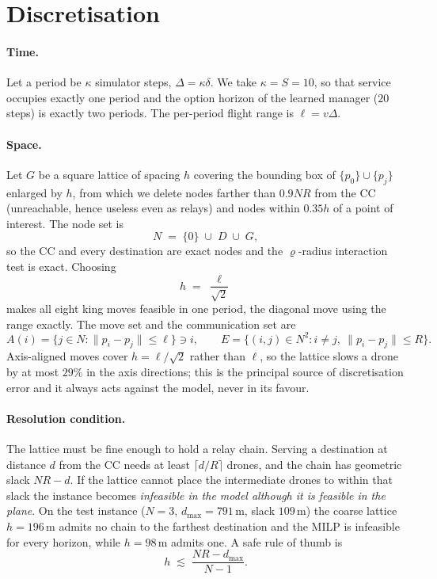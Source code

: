 \documentclass[11pt]{article}
\begin{document}
\section{Discretisation}

\paragraph{Time.} Let a period be $\kappa$ simulator steps, $\Delta = \kappa \delta$. We take
$\kappa = S = 10$, so that service occupies exactly one period and the option horizon of the
learned manager ($20$ steps) is exactly two periods. The per-period flight range is
$\ell = v\Delta$.

\paragraph{Space.} Let $G$ be a square lattice of spacing $h$ covering the bounding box of
$\{p_0\} \cup \{p_j\}$ enlarged by $h$, from which we delete nodes farther than $0.9NR$ from
the CC (unreachable, hence useless even as relays) and nodes within $0.35h$ of a point of
interest. The node set is
\[
  N \;=\; \{0\} \;\cup\; D \;\cup\; G ,
\]
so the CC and every destination are exact nodes and the $\varrho$-radius interaction test is
exact. Choosing
\[
  h \;=\; \frac{\ell}{\sqrt{2}}
\]
makes all eight king moves feasible in one period, the diagonal move using the range
exactly. The move set and the communication set are
\[
  A(i) = \{ j \in N : \|p_i - p_j\| \le \ell \} \ni i,
  \qquad
  E = \{ (i,j) \in N^2 : i \ne j,\ \|p_i - p_j\| \le R \} .
\]
Axis-aligned moves cover $h = \ell/\sqrt2$ rather than $\ell$, so the lattice slows a drone
by at most $29\%$ in the axis directions; this is the principal source of discretisation
error and it always acts against the model, never in its favour.

\paragraph{Resolution condition.} The lattice must be fine enough to hold a relay chain.
Serving a destination at distance $d$ from the CC needs at least $\lceil d/R \rceil$ drones,
and the chain has geometric slack $NR - d$. If the lattice cannot place the intermediate
drones to within that slack the instance becomes \emph{infeasible in the model although it is
feasible in the plane}. On the test instance ($N = 3$, $d_{\max} = 791$\,m, slack $109$\,m)
the coarse lattice $h = 196$\,m admits no chain to the farthest destination and the MILP is
infeasible for every horizon, while $h = 98$\,m admits one. A safe rule of thumb is
\[
  h \;\lesssim\; \frac{NR - d_{\max}}{N-1}.
\]
\end{document}
